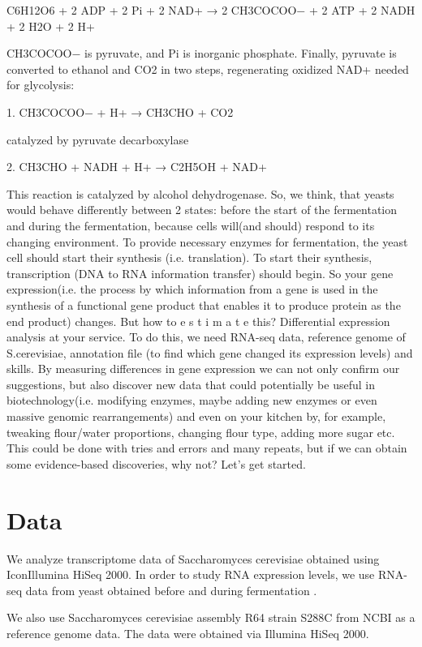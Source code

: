 \documentclass{article}
\begin{document}
 C6H12O6 + 2 ADP + 2 Pi + 2 NAD+ → 2 CH3COCOO− + 2 ATP + 2 NADH \\
 + 2 H2O + 2 H+
 
 CH3COCOO− is pyruvate, and Pi is inorganic phosphate. Finally, pyruvate is converted to ethanol and CO2 in two steps, regenerating oxidized NAD+ needed for glycolysis:
 
 1. CH3COCOO− + H+ → CH3CHO + CO2
 
 catalyzed by pyruvate decarboxylase
 
 2. CH3CHO + NADH + H+ → C2H5OH + NAD+
 
 This reaction is catalyzed by alcohol dehydrogenase.
 So, we think, that yeasts would behave differently between 2 states: before the start of the fermentation and during the fermentation, because cells will(and should) respond to its changing environment. To provide necessary enzymes for fermentation, the yeast cell should start their synthesis (i.e. translation). To start their synthesis, transcription (DNA to RNA information transfer) should begin. So your gene expression(i.e. the process by which information from a gene is used in the synthesis of a functional gene product that enables it to produce protein as the end product\cite{3}) changes. But how to e s t i m a t e this? Differential expression analysis at your service. To do this, we need RNA-seq data, reference genome of S.cerevisiae, annotation file (to find which gene changed its expression levels) and skills. By measuring differences in gene expression we can not only confirm our suggestions, but also discover new data that could potentially be useful in biotechnology(i.e. modifying enzymes, maybe adding new enzymes or even massive genomic rearrangements) and even on your kitchen by, for example, tweaking flour/water proportions, changing flour type, adding more sugar etc. This could be done with tries and errors and many repeats, but if we can obtain some evidence-based discoveries, why not?
 Let's get started.
 
 
 \section{Data}
We analyze transcriptome data of Saccharomyces cerevisiae
obtained using IconIllumina HiSeq 2000.   In order to study RNA expression levels, we use RNA-seq data from yeast obtained before and during fermentation \cite{data}. 

We also use Saccharomyces cerevisiae assembly R64  strain S288C from NCBI \cite{ncb} as a reference genome data. The data were obtained via  	Illumina HiSeq 2000.  %
\end{document}
